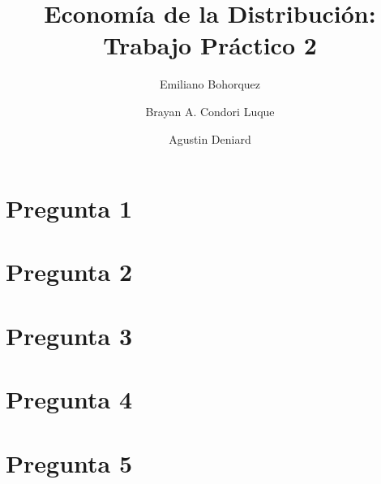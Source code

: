 \documentclass[11pt,oneside]{article}
\begin{document}
	
	
	\title{Economía de la Distribución: Trabajo Práctico 2}
	\author{
		Emiliano Bohorquez \and 
		Brayan A. Condori Luque \and 
		Agustin Deniard}
	
	\maketitle
	
	\section*{Pregunta 1}
	
	
	\section*{Pregunta 2}
	
	
	\section*{Pregunta 3}
	
	\section*{Pregunta 4}
	
	\section*{Pregunta 5}
\end{document}
